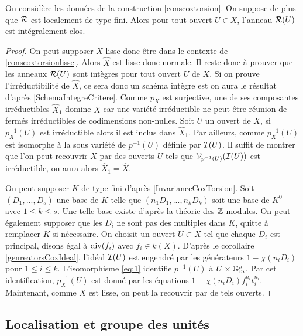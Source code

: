 \begin{thm}
On considère les données de la construction \ref{conscoxtorsion}. On suppose de plus que $\mathcal{R}$ est localement de type fini. Alors pour tout ouvert $U\in X$, l'anneau $\mathcal{R}(U)$ est intégralement clos.
\end{thm}
\begin{proof}
On peut supposer $X$ lisse donc être dans le contexte de \ref{conscoxtorsionlisse}. Alors $\widehat{X}$ est lisse donc normale. Il reste donc à prouver que les anneaux $\mathcal{R}(U)$ sont intègres pour tout ouvert $U$ de $X$. Si on prouve l'irréductibilité de $\widehat{X}$, ce sera donc un schéma intègre est on aura le résultat d'après \ref{SchemaIntegreCritere}. Comme $p_X$ est surjective, une de ses composantes irréductibles $\widehat{X}_1$ domine $X$ car une variété irréductible ne peut être réunion de fermés irréductibles de codimensions non-nulles. Soit $U$ un ouvert de $X$, si $p_X^{-1}(U)$ est irréductible alors il est inclus dans $\widehat{X}_1$. Par ailleurs, comme $p_X^{-1}(U)$ est isomorphe à la sous variété de $p^{-1}(U)$ définie par $\mathcal{I}(U)$. Il suffit de montrer que l'on peut recouvrir $X$ par des ouverts $U$ tels que $\mathcal{V}_{p^{-1}(U)}(\mathcal{I}(U))$ est irréductible, on aura alors $\widehat{X}_1=\widehat{X}$.

On peut supposer $K$ de type fini d'après \ref{InvarianceCoxTorsion}. Soit $(D_1,...,D_s)$ une base de $K$ telle que $(n_1D_1,...,n_kD_k)$ soit une base de $K^0$ avec $1\leq k\leq s$. Une telle base existe d'après la théorie des $\mathbb{Z}$-modules. On peut également supposer que les $D_i$ ne sont pas des multiples dans $K$, quitte à remplacer $K$ si nécessaire. On choisit un ouvert $U\subset X$ tel que chaque $D_i$ est principal, disons égal à $\operatorname{div}(f_i)$ avec $f_i\in k(X)$. D'après le corollaire \ref{genreatorsCoxIdeal}, l'idéal $\mathcal{I}(U)$ est engendré par les générateurs $1-\chi(n_iD_i)$ pour $1\leq i\leq k$. L'isomorphisme \ref{eq:1} identifie $p^{-1}(U)$ à $U\times \mathbb{G}_m^s$. Par cet identification, $p_X^{-1}(U)$ est donné par les équations $1-\chi(n_iD_i)f_i^{n_i}t_i^{n_i}$. 
Maintenant, comme $X$ est lisse, on peut la recouvrir par de tels ouverts.
\end{proof}

\subsection{Localisation et groupe des unités}

